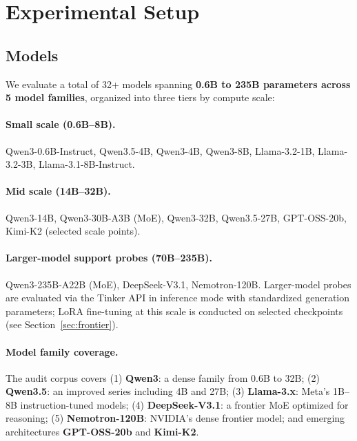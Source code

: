 \documentclass{article}
\begin{document}
\section{Experimental Setup}
\label{sec:setup}

\subsection{Models}

We evaluate a total of 32+ models spanning \textbf{0.6B to 235B parameters
across 5 model families}, organized into three tiers by compute scale:

\paragraph{Small scale (0.6B--8B).}
Qwen3-0.6B-Instruct, Qwen3.5-4B, Qwen3-4B, Qwen3-8B,
Llama-3.2-1B, Llama-3.2-3B, Llama-3.1-8B-Instruct.

\paragraph{Mid scale (14B--32B).}
Qwen3-14B, Qwen3-30B-A3B (MoE), Qwen3-32B, Qwen3.5-27B,
GPT-OSS-20b, Kimi-K2 (selected scale points).

\paragraph{Larger-model support probes (70B--235B).}
Qwen3-235B-A22B (MoE), DeepSeek-V3.1, Nemotron-120B.
Larger-model probes are evaluated via the Tinker API in inference mode
with standardized generation parameters; LoRA fine-tuning at this
scale is conducted on selected checkpoints (see Section~\ref{sec:frontier}).

\paragraph{Model family coverage.}
The audit corpus covers (1) \textbf{Qwen3}: a dense family from 0.6B to 32B;
(2) \textbf{Qwen3.5}: an improved series including 4B and 27B;
(3) \textbf{Llama-3.x}: Meta's 1B--8B instruction-tuned models;
(4) \textbf{DeepSeek-V3.1}: a frontier MoE optimized for reasoning;
(5) \textbf{Nemotron-120B}: NVIDIA's dense frontier model;
and emerging architectures \textbf{GPT-OSS-20b} and \textbf{Kimi-K2}.
\end{document}
